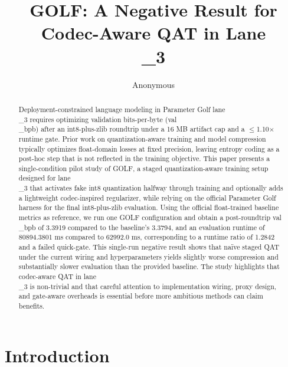 \documentclass{article}
\title{GOLF: A Negative Result for Codec-Aware QAT in Lane\\_3}
\author{Anonymous}
\begin{document}
\maketitle

\begin{abstract}
Deployment-constrained language modeling in Parameter Golf lane\\_3 requires optimizing validation bits-per-byte (val\\_bpb) after an int8-plus-zlib roundtrip under a 16 MB artifact cap and a $\leq$1.10$\times$ runtime gate. Prior work on quantization-aware training and model compression typically optimizes float-domain losses at fixed precision, leaving entropy coding as a post-hoc step that is not reflected in the training objective. This paper presents a single-condition pilot study of GOLF, a staged quantization-aware training setup designed for lane\\_3 that activates fake int8 quantization halfway through training and optionally adds a lightweight codec-inspired regularizer, while relying on the official Parameter Golf harness for the final int8-plus-zlib evaluation. Using the official float-trained baseline metrics as reference, we run one GOLF configuration and obtain a post-roundtrip val\\_bpb of 3.3919 compared to the baseline's 3.3794, and an evaluation runtime of 80894.3801 ms compared to 62992.0 ms, corresponding to a runtime ratio of 1.2842 and a failed quick-gate. This single-run negative result shows that naïve staged QAT under the current wiring and hyperparameters yields slightly worse compression and substantially slower evaluation than the provided baseline. The study highlights that codec-aware QAT in lane\\_3 is non-trivial and that careful attention to implementation wiring, proxy design, and gate-aware overheads is essential before more ambitious methods can claim benefits.
\end{abstract}

\section{Introduction}

\label{sec:introduction}
\end{document}
